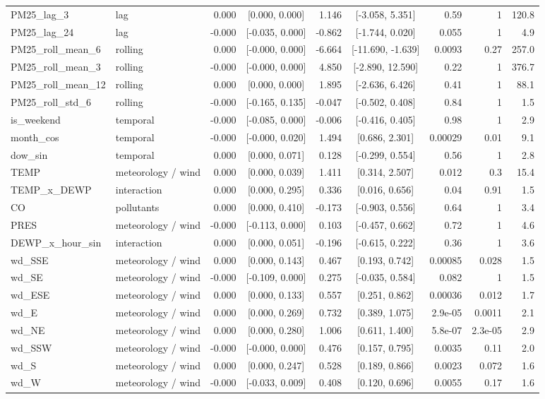 \begin{table}[t]
\begin{tabular}{llrcrcrrr}
PM25\_lag\_3 & lag & 0.000 & [0.000, 0.000] & 1.146 & [-3.058, 5.351] & 0.59 & 1 & 120.8 \\
PM25\_lag\_24 & lag & -0.000 & [-0.035, 0.000] & -0.862 & [-1.744, 0.020] & 0.055 & 1 & 4.9 \\
PM25\_roll\_mean\_6 & rolling & 0.000 & [-0.000, 0.000] & -6.664 & [-11.690, -1.639] & 0.0093 & 0.27 & 257.0 \\
PM25\_roll\_mean\_3 & rolling & -0.000 & [-0.000, 0.000] & 4.850 & [-2.890, 12.590] & 0.22 & 1 & 376.7 \\
PM25\_roll\_mean\_12 & rolling & 0.000 & [0.000, 0.000] & 1.895 & [-2.636, 6.426] & 0.41 & 1 & 88.1 \\
PM25\_roll\_std\_6 & rolling & -0.000 & [-0.165, 0.135] & -0.047 & [-0.502, 0.408] & 0.84 & 1 & 1.5 \\
is\_weekend & temporal & -0.000 & [-0.085, 0.000] & -0.006 & [-0.416, 0.405] & 0.98 & 1 & 2.9 \\
month\_cos & temporal & -0.000 & [-0.000, 0.020] & 1.494 & [0.686, 2.301] & 0.00029 & 0.01 & 9.1 \\
dow\_sin & temporal & 0.000 & [0.000, 0.071] & 0.128 & [-0.299, 0.554] & 0.56 & 1 & 2.8 \\
TEMP & meteorology / wind & 0.000 & [0.000, 0.039] & 1.411 & [0.314, 2.507] & 0.012 & 0.3 & 15.4 \\
TEMP\_x\_DEWP & interaction & 0.000 & [0.000, 0.295] & 0.336 & [0.016, 0.656] & 0.04 & 0.91 & 1.5 \\
CO & pollutants & 0.000 & [0.000, 0.410] & -0.173 & [-0.903, 0.556] & 0.64 & 1 & 3.4 \\
PRES & meteorology / wind & -0.000 & [-0.113, 0.000] & 0.103 & [-0.457, 0.662] & 0.72 & 1 & 4.6 \\
DEWP\_x\_hour\_sin & interaction & 0.000 & [0.000, 0.051] & -0.196 & [-0.615, 0.222] & 0.36 & 1 & 3.6 \\
wd\_SSE & meteorology / wind & 0.000 & [0.000, 0.143] & 0.467 & [0.193, 0.742] & 0.00085 & 0.028 & 1.5 \\
wd\_SE & meteorology / wind & -0.000 & [-0.109, 0.000] & 0.275 & [-0.035, 0.584] & 0.082 & 1 & 1.5 \\
wd\_ESE & meteorology / wind & 0.000 & [0.000, 0.133] & 0.557 & [0.251, 0.862] & 0.00036 & 0.012 & 1.7 \\
wd\_E & meteorology / wind & 0.000 & [0.000, 0.269] & 0.732 & [0.389, 1.075] & 2.9e-05 & 0.0011 & 2.1 \\
wd\_NE & meteorology / wind & 0.000 & [0.000, 0.280] & 1.006 & [0.611, 1.400] & 5.8e-07 & 2.3e-05 & 2.9 \\
wd\_SSW & meteorology / wind & -0.000 & [-0.000, 0.000] & 0.476 & [0.157, 0.795] & 0.0035 & 0.11 & 2.0 \\
wd\_S & meteorology / wind & 0.000 & [0.000, 0.247] & 0.528 & [0.189, 0.866] & 0.0023 & 0.072 & 1.6 \\
wd\_W & meteorology / wind & -0.000 & [-0.033, 0.009] & 0.408 & [0.120, 0.696] & 0.0055 & 0.17 & 1.6 \\
\bottomrule
\end{tabular}
\end{table}
